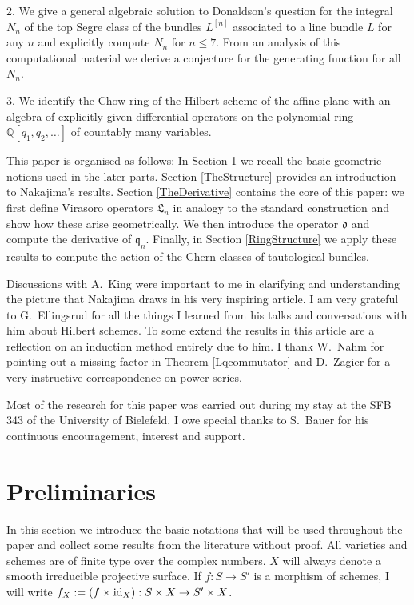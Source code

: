 \documentclass[twoside,11pt]{article}
\newcommand{\IQ}{{\mathbb Q}}
\newcommand{\gothd}{{\mathfrak d}}
\newcommand{\gothq}{{\mathfrak q}}
\newcommand{\gothL}{{\mathfrak L}}
\newcommand{\dd}{\gothd}
\newcommand{\qq}{\gothq}
\newcommand{\LL}{\gothL}
\newcommand{\id}{{\rm id}}
\begin{document}
2. We give a general algebraic solution to Donaldson's question for the
integral $N_n$ of the top Segre class of the bundles $L^{[n]}$ associated to a line bundle $L$ for any $n$ and explicitly compute $N_n$ for $n\leq7$. From
an analysis of this computational material we derive a conjecture for the
generating function for all $N_n$.

3. We identify the Chow ring of the Hilbert scheme of the affine plane
with an algebra of explicitly given differential operators on the polynomial
ring $\IQ[q_1,q_2,\ldots]$ of countably many variables.

This paper is organised as follows: In Section \ref{Preliminaries} we recall
the basic geometric notions used in the later parts. Section \ref{TheStructure} 
provides an introduction to Nakajima's results. Section \ref{TheDerivative} 
contains the core of this paper: we first define Virasoro operators $\LL_n$ in
analogy to the standard construction and show how these arise geometrically.
We then introduce the operator $\dd$ and compute the derivative of $\qq_n$.
Finally, in Section \ref{RingStructure} we apply these results to compute
the action of the Chern classes of tautological bundles.
 
Discussions with A.\ King were
important to me in clarifying and understanding the picture that Nakajima
draws in his very inspiring article. I am very grateful to G.\ Ellingsrud
for all the things I learned from his talks and conversations with him about
Hilbert schemes. To some extend the results in this article are a reflection on
an induction method entirely due to him. I thank W.\ Nahm for pointing out
a missing factor in Theorem \ref{Lqcommutator} and D.\ Zagier for a very instructive correspondence on power series.

Most of the research for this paper
was carried out during my stay at the SFB 343 of the University of Bielefeld.
I owe special thanks to S.\ Bauer for his continuous encouragement, interest and support.



\section{Preliminaries}\label{Preliminaries}

In this section we introduce the basic notations that will be used throughout
the paper and collect some results from the literature without proof.
All varieties and schemes are of finite type over the complex numbers. $X$
will always denote a smooth irreducible projective surface.
If $f:S\to S'$ is a morphism of schemes, I will write $f_X:=(f\times\id_X):S\times X\to S'\times X$.
\end{document}
